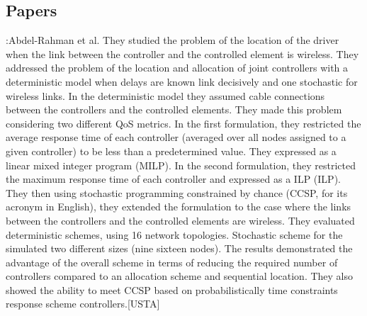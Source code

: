 \documentclass[a4paper,10pt]{article}
\begin{document}
\subsection{Papers}
\cite{AbMa17}:Abdel-Rahman et al. They studied the problem of the location of the driver when the link between the controller and the controlled element is wireless. They addressed the problem of the location and allocation of joint controllers with a deterministic model when delays are known link decisively and one stochastic for wireless links.
In the deterministic model they assumed cable connections between the controllers and the controlled elements. They made this problem considering two different QoS metrics. In the first formulation, they restricted the average response time of each controller (averaged over all nodes assigned to a given controller) to be less than a predetermined value. They expressed as a linear mixed integer program (MILP). In the second formulation, they restricted the maximum response time of each controller and expressed as a ILP (ILP). They then using stochastic programming constrained by chance (CCSP, for its acronym in English), they extended the formulation to the case where the links between the controllers and the controlled elements are wireless.
They evaluated deterministic schemes, using 16 network topologies. Stochastic scheme for the simulated two different sizes (nine sixteen nodes). The results demonstrated the advantage of the overall scheme in terms of reducing the required number of controllers compared to an allocation scheme and sequential location. They also showed the ability to meet CCSP based on probabilistically time constraints response scheme controllers.[USTA]
\end{document}
